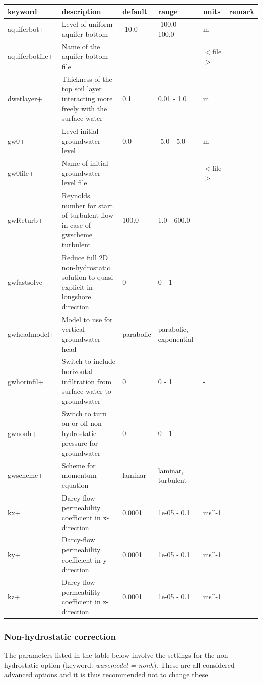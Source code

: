 \documentclass{article}
\begin{document}
\begin{tabular}{|p{0.9in}|p{0.9in}|p{0.6in}|p{0.8in}|p{0.5in}|p{0.5in}|} \hline 
keyword & description & default & range & units & remark \\ \hline 
aquiferbot+ & Level of uniform aquifer bottom & -10.0 & -100.0 - 100.0 & m &  \\ \hline 
aquiferbotfile+ & Name of the aquifer bottom file &  &  & $<$file$>$ &  \\ \hline 
dwetlayer+ & Thickness of the top soil layer interacting more freely with the surface water & 0.1 & 0.01 - 1.0 & m &  \\ \hline 
gw0+ & Level initial groundwater level & 0.0 & -5.0 - 5.0 & m &  \\ \hline 
gw0file+ & Name of initial groundwater level file &  &  & $<$file$>$ &  \\ \hline 
gwReturb+ & Reynolds number for start of turbulent flow in case of gwscheme = turbulent & 100.0 & 1.0 - 600.0 & - &  \\ \hline 
gwfastsolve+ & Reduce full 2D non-hydrostatic solution to quasi-explicit in longshore direction & 0 & 0 - 1 & - &  \\ \hline 
gwheadmodel+ & Model to use for vertical groundwater head & parabolic & parabolic, exponential &  &  \\ \hline 
gwhorinfil+ & Switch to include horizontal infiltration from surface water to groundwater & 0 & 0 - 1 & - &  \\ \hline 
gwnonh+ & Switch to turn on or off non-hydrostatic pressure for groundwater & 0 & 0 - 1 & - &  \\ \hline 
gwscheme+ & Scheme for momentum equation & laminar & laminar, turbulent &  &  \\ \hline 
kx+ & Darcy-flow permeability coefficient in x-direction & 0.0001 & 1e-05 - 0.1 & ms\^{}-1 &  \\ \hline 
ky+ & Darcy-flow permeability coefficient in y-direction & 0.0001 & 1e-05 - 0.1 & ms\^{}-1 &  \\ \hline 
kz+ & Darcy-flow permeability coefficient in z-direction & 0.0001 & 1e-05 - 0.1 & ms\^{}-1 &  \\ \hline 
\end{tabular}


\subsubsection{ Non-hydrostatic correction}

\noindent The parameters listed in the table below involve the settings for the non-hydrostatic option (keyword: \textit{wavemodel = nonh}). These are all considered advanced options and it is thus recommended not to change these
\end{document}

